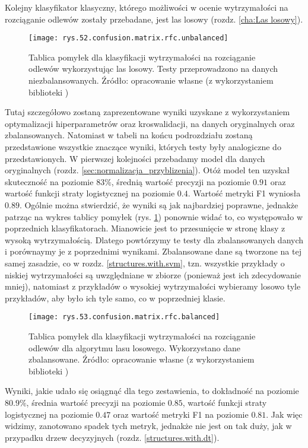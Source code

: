 Kolejny klasyfikator klasyczny, którego możliwości w ocenie wytrzymałości na rozciąganie odlewów zostały przebadane, jest las losowy (rozdz. \ref{cha:Las losowy}). 
\begin{figure}[!h]
    \centering
    \texttt{[image: rys.52.confusion.matrix.rfc.unbalanced]}
    \caption{Tablica pomyłek dla klasyfikacji wytrzymałości na rozciąganie odlewów wykorzystując las losowy. Testy przeprowadzono na danych niezbalansowanych. Źródło: opracowanie własne (z wykorzystaniem biblioteki )}
    \label{rys.52.confusion.matrix.rfc.unbalanced}
\end{figure}
Tutaj szczegółowo zostaną zaprezentowane wyniki uzyskane z wykorzystaniem optymalizacji hiperparametrów oraz kroswalidacji, na danych oryginalnych oraz zbalansowanych. Natomiast w tabeli na końcu podrozdziału zostaną przedstawione wszystkie znaczące wyniki, których testy były analogiczne do przedstawionych. 
W pierwszej kolejności przebadamy model dla danych oryginalnych (rozdz. \ref{sec:normalizacja_przyblizenia}). Otóż model ten uzyskał skuteczność na poziomie $83\%$, średnią wartość precyzji na poziomie $0.91$ oraz wartość funkcji straty logistycznej na poziomie $0.4$. Wartość metryki F1 wyniosła $0.89$. Ogólnie można stwierdzić, że wyniki są jak najbardziej poprawne, jednakże patrząc na wykres tablicy pomyłek (rys. \ref{rys.52.confusion.matrix.rfc.unbalanced}) ponownie widać to, co występowało w poprzednich klasyfikatorach. Mianowicie jest to przesunięcie w stronę klasy z wysoką wytrzymałością. Dlatego powtórzymy te testy dla zbalansowanych danych i porównaymy je z poprzednimi wynikami. 
Zbalansowane dane są tworzone na tej samej zasadzie, co w rozdz. \ref{structures.with.svm}, tzn. wszystkie przykłady o niskiej wytrzymałości są uwzględniane w zbiorze (ponieważ jest ich zdecydowanie mniej), natomiast z przykładów o wysokiej wytrzymałości wybieramy losowo tyle przykładów, aby było ich tyle samo, co w poprzedniej klasie. 
\begin{figure}[h]
    \centering
    \texttt{[image: rys.53.confusion.matrix.rfc.balanced]}
    \caption{Tablica pomyłek dla klasyfikacji wytrzymałości na rozciąganie odlewów dla algorytmu lasu losowego. Wykorzystano dane zbalansowane. Źródło: opracowanie własne (z wykorzystaniem biblioteki )}
    \label{rys.53.confusion.matrix.rfc.balanced}
\end{figure}
Wyniki, jakie udało się osiągnąć dla tego zestawienia, to dokładność na poziomie $80.9\%$, średnia wartość precyzji na poziomie $0.85$, wartość funkcji straty logistycznej na poziomie $0.47$ oraz wartość metryki F1 na poziomie $0.81$. Jak więc widzimy, zanotowano spadek tych metryk, jednakże nie jest on tak duży, jak w przypadku drzew decyzyjnych (rozdz. \ref{structures.with.dt}). 

